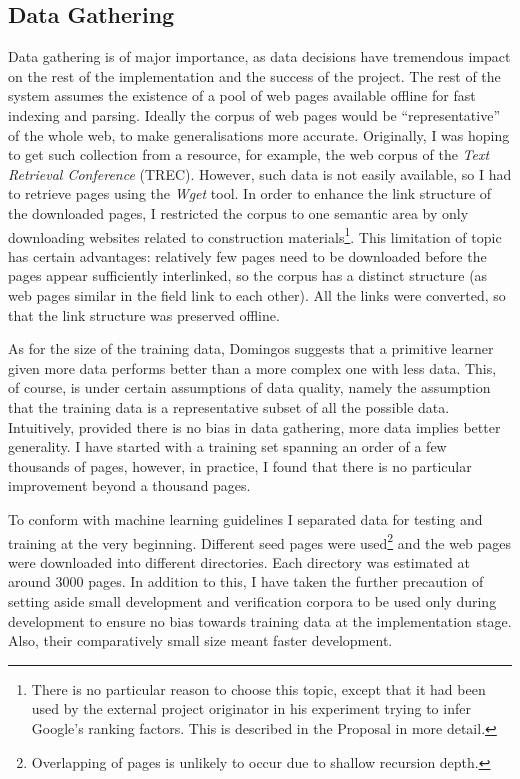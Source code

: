 \documentclass[12pt,notitlepage,twoside]{scrreprt}
\begin{document}
\subsection{Data Gathering}
\label{prep:data}
Data gathering is of major importance, as data decisions have tremendous impact on the
rest of the implementation and the success of the project. The rest of the system assumes
the existence of a pool of web pages available offline for fast indexing and parsing.
Ideally the corpus of web pages would be ``representative'' of the whole web, to make
generalisations more accurate.  Originally, I was hoping to get such collection from a
resource, for example, the web corpus of the \textit{Text Retrieval Conference} (TREC).
However, such data is not easily available, so I had to retrieve pages using the
\textit{Wget} tool. In order to enhance the link structure of the downloaded pages, I restricted the corpus to one
semantic area by only downloading websites related to construction
materials\footnote{There is no particular reason to choose this topic, except that it had
been used by the external project originator in his experiment trying to infer Google's
ranking factors. This is described in the Proposal in more detail.}. This limitation of
topic has certain advantages: relatively few pages need to be  downloaded before the pages
appear sufficiently interlinked, so the corpus has a distinct structure (as web pages
similar in the field link to each other). All the links were converted, so that the link
structure was preserved offline.

As for the size of the training data, Domingos \cite{domingos} suggests that a primitive
learner given more data performs better than a more complex one with less data.  This, of
course, is under certain assumptions of data quality, namely the assumption that the
training data is a representative subset of all the possible data. Intuitively, provided
there is no bias in data gathering, more data implies better generality. I have started
with a training set spanning an order of a few thousands of pages, however, in practice, I
found that there is no particular improvement beyond a thousand pages.

To conform with machine learning guidelines I separated data for testing and training at the
very beginning. Different seed pages were used\footnote{Overlapping of pages is unlikely
to occur due to shallow recursion depth.} and the web pages were downloaded into
different directories.  Each directory was estimated at around 3000 pages. In addition to
this, I have taken the further precaution of setting aside small development and
verification corpora to be used only during development to ensure no bias towards training
data at the implementation stage. Also, their comparatively small size meant faster
development.
\end{document}
